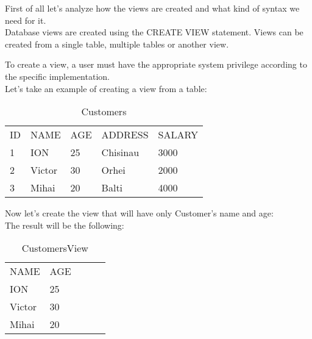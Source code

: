 First of all let's analyze how the views are created and what kind of syntax we need for it.\\
Database views are created using the CREATE VIEW statement. Views can be created from a single table, multiple tables or another view.

To create a view, a user must have the appropriate system privilege according to the specific implementation.\\



Let's take an example of creating a view from a table:\\
\begin{table}[ht!]
\centering
\caption{Customers}
\label{my-label}
\begin{tabular}{lllll}
ID & NAME   & AGE & ADDRESS  & SALARY \\
1  & ION    & 25  & Chisinau & 3000   \\
2  & Victor & 30  & Orhei    & 2000   \\
3  & Mihai  & 20  & Balti    & 4000  
\end{tabular}
\end{table}
Now let's create the view that will have only Customer's name and age:\\

The result will be the following:\\
\begin{table}[ht!]
\centering
\caption{CustomersView}
\begin{tabular}{lllll}
NAME   & AGE &  &  &  \\
ION    & 25  &  &  &  \\
Victor & 30  &  &  &  \\
Mihai  & 20  &  &  & 
\end{tabular}
\end{table}
\clearpage

